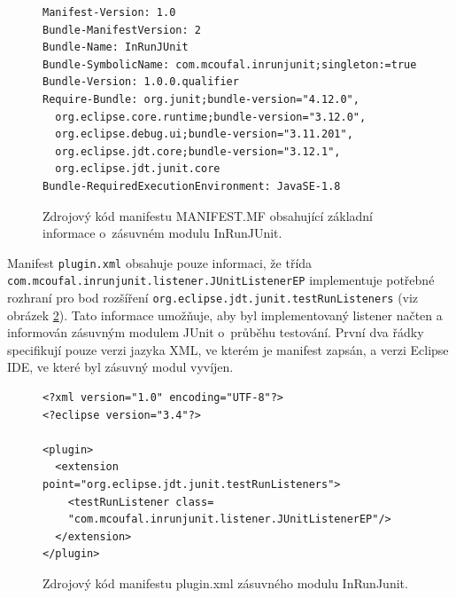 	\lstset{language=}
	\begin{figure}[h]
	  \begin{lstlisting}[frame=single]
Manifest-Version: 1.0
Bundle-ManifestVersion: 2
Bundle-Name: InRunJUnit
Bundle-SymbolicName: com.mcoufal.inrunjunit;singleton:=true
Bundle-Version: 1.0.0.qualifier
Require-Bundle: org.junit;bundle-version="4.12.0",
  org.eclipse.core.runtime;bundle-version="3.12.0",
  org.eclipse.debug.ui;bundle-version="3.11.201",
  org.eclipse.jdt.core;bundle-version="3.12.1",
  org.eclipse.jdt.junit.core
Bundle-RequiredExecutionEnvironment: JavaSE-1.8
	  \end{lstlisting}
	  \caption{Zdrojový kód manifestu MANIFEST.MF obsahující základní informace o~zásuvném modulu InRunJUnit.}
	  \label{code:manifest.mf}
	\end{figure}
	
	Manifest \texttt{plugin.xml} obsahuje pouze informaci, že třída \texttt{com.mcoufal.in\-run\-ju\-nit.lis\-tener.JU\-nit\-ListenerEP} implementuje potřebné rozhraní pro bod rozšíření \texttt{org.ecli\-pse.jdt.ju\-nit.test\-Run\-Lis\-teners} (viz obrázek \ref{code:plugin.xml}). Tato informace umožňuje, aby byl implementovaný listener načten a informován zásuvným modulem JUnit o~průběhu testování. První dva řádky specifikují pouze verzi jazyka XML, ve kterém je manifest zapsán, a verzi Eclipse IDE, ve které byl zásuvný modul vyvíjen.

	\lstset{language=xml}
	\begin{figure}[h]
	  \begin{lstlisting}[frame=single]
<?xml version="1.0" encoding="UTF-8"?>
<?eclipse version="3.4"?>

<plugin>
  <extension point="org.eclipse.jdt.junit.testRunListeners">
    <testRunListener class=
    "com.mcoufal.inrunjunit.listener.JUnitListenerEP"/>
  </extension>
</plugin>
	  \end{lstlisting}
	  \caption{Zdrojový kód manifestu plugin.xml zásuvného modulu InRunJunit.}
	  \label{code:plugin.xml}
	\end{figure}

